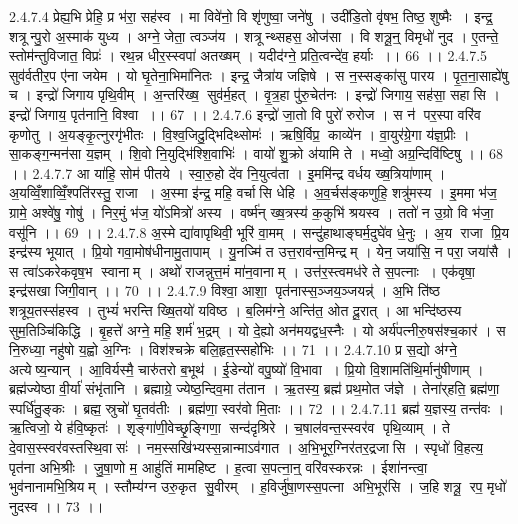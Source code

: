 2.4.7.4
प्रेह्य॒भि प्रेहि॒ प्र भ॑रा॒ सह॑स्व । मा विवे॑नो॒ वि शृ॑णुष्वा॒ जने॑षु । उदी॑डि॒तो वृ॑षभ॒ तिष्ठ॒ शुष्मैः । इन्द्र॒ शत्रून्पु॒रो अ॒स्माक॑ युध्य । अग्ने॒ जेता॒ त्वञ्ज॑य । शत्रून्थ्सहस॒ ओज॑सा । वि शत्रू॒न्॒ विमृधो॑ नुद । ए॒तन्ते॒ स्तोम॑न्तुविजात॒ विप्रः॑ । रथ॒न्न धीर॒स्स्वपा॑ अतख्षम् । यदीद॑ग्ने॒ प्रति॒त्वन्दे॑व॒ हर्याः ।। 66 ।।
2.4.7.5
सुव॑र्वतीर॒प ए॑ना जयेम । यो घृ॒तेना॒भिमा॑नितः । इन्द्र॒ जैत्रा॑य जज्ञिषे । स न॒स्सङ्का॑सु पारय । पृ॒त॒ना॒साह्ये॑षु च । इन्द्रो॑ जिगाय पृथि॒वीम् । अ॒न्तरि॑ख्ष॒॒ सुव॑र्म॒हत् । वृ॒त्र॒हा पु॑रु॒चेत॑नः । इन्द्रो॑ जिगाय॒ सह॑सा॒ सहा॑सि । इन्द्रो॑ जिगाय॒ पृत॑नानि॒ विश्वा ।। 67 ।।
2.4.7.6
इन्द्रो॑ जा॒तो वि पुरो॑ रुरोज । स न॑ पर॒स्पा वरि॑व कृणोतु । अ॒यङ्कृ॒त्नुरगृ॑भीतः । वि॒श्व॒जिदु॒द्भिदिथ्सोमः॑ । ऋषि॒र्विप्र॒ काव्ये॑न । वा॒युर॑ग्रे॒गा य॑ज्ञ॒प्रीः । सा॒कङ्ग॒न्मन॑सा य॒ज्ञम् । शि॒वो नि॒युद्भि॑श्शि॒वाभिः॑ । वायो॑ शु॒क्रो अ॑यामि ते । मध्वो॒ अग्र॒न्दिवि॑ष्टिषु ।। 68 ।।
2.4.7.7
आ या॑हि॒ सोम॑ पीतये । स्वा॒रु॒हो दे॑व नि॒युत्व॑ता । इ॒ममि॑न्द्र वर्धय ख्ष॒त्रिया॑णाम् । अ॒यव्विँ॒शाव्विँ॒श्पति॑रस्तु॒ राजा । अ॒स्मा इ॑न्द्र॒ महि॒ वर्चा॑सि धेहि । अ॒व॒र्चस॑ङ्कणुहि॒ शत्रु॑मस्य । इ॒ममा भ॑ज॒ ग्रामे॒ अश्वे॑षु॒ गोषु॑ । निर॒मुं भ॑ज॒ यो॑ऽमित्रो॑ अस्य । वर्ष्म॑न् ख्ष॒त्रस्य॑ क॒कुभि॑ श्रयस्व । ततो॑ न उ॒ग्रो वि भ॑जा॒ वसू॑नि ।। 69 ।।
2.4.7.8
अ॒स्मे द्या॑वापृथिवी॒ भूरि॑ वा॒मम् । सन्दु॑हाथाङ्घर्म॒दुघे॑व धे॒नुः । अ॒य राजा प्रि॒य इन्द्र॑स्य भूयात् । प्रि॒यो गवा॒मोष॑धीनामु॒तापाम् । यु॒नज्मि॑ त उत्त॒राव॑न्त॒मिन्द्रम् । येन॒ जया॑सि॒ न परा॒ जया॑सै । स त्वा॑ऽकरेकवृष॒भ स्वानाम् । अथो॑ राजन्नुत्त॒मं मा॑न॒वानाम् । उत्त॑र॒स्त्वमध॑रे ते स॒पत्नाः । एक॑वृषा॒ इन्द्र॑सखा जिगी॒वान् ।। 70 ।।
2.4.7.9
विश्वा॒ आशा॒ पृत॑नास्स॒ञ्जय॒ञ्जयन्न्॑ । अ॒भि ति॑ष्ठ शत्रूय॒तस्स॑हस्व । तुभ्यं॑ भरन्ति ख्षि॒तयो॑ यविष्ठ । ब॒लिम॑ग्ने॒ अन्ति॑त॒ ओत दू॒रात् । आ भन्दि॑ष्ठस्य सुम॒तिञ्चि॑किद्धि । बृ॒हत्ते॑ अग्ने॒ महि॒ शर्म॑ भ॒द्रम् । यो दे॒ह्यो अन॑मयद्वध॒स्नैः । यो अर्य॑पत्नीरु॒षस॑श्च॒कार॑ । स नि॒रुध्या॒ नहु॑षो य॒ह्वो अ॒ग्निः । विश॑श्चक्रे बलि॒हृत॒स्सहो॑भिः ।। 71 ।।
2.4.7.10
प्र स॒द्यो अ॑ग्ने॒ अत्येष्य॒न्यान् । आ॒विर्यस्मै॒ चारु॑तरो ब॒भूथ॑ । ई॒डेन्यो॑ वपु॒ष्यो॑ वि॒भावा । प्रि॒यो वि॒शामति॑थि॒र्मानु॑षीणाम् । ब्रह्म॑ज्येष्ठा वी॒र्या॑ संभृ॑तानि । ब्रह्माग्रे॒ ज्येष्ठ॒न्दिव॒मा त॑तान । ऋ॒तस्य॒ ब्रह्म॑ प्रथ॒मोत ज॑ज्ञे । तेना॑र्‌हति॒ ब्रह्म॑णा॒ स्पर्धि॑तु॒ङ्कः । ब्रह्म॒ स्रुचो॑ घृ॒तव॑तीः । ब्रह्म॑णा॒ स्वर॑वो मि॒ताः ।। 72 ।।
2.4.7.11
ब्रह्म॑ य॒ज्ञस्य॒ तन्त॑वः । ऋ॒त्विजो॒ ये ह॑वि॒ष्कृतः॑ । शृङ्गा॑णी॒वेच्छृ॒ङ्गिणा॒॒ सन्द॑दृश्रिरे । च॒षाल॑वन्त॒स्स्वर॑व पृथि॒व्याम् । ते दे॒वास॒स्स्वर॑वस्तस्थि॒वासः॑ । नम॒स्सखि॑भ्यस्स॒न्नान्माऽव॑गात । अ॒भि॒भूर॒ग्निर॑तर॒द्रजा॑सि । स्पृधो॑ वि॒हत्य॒ पृत॑ना अभि॒श्रीः । जु॒षा॒णो म॒ आहु॑तिं मामहिष्ट । ह॒त्वा स॒पत्ना॒न्॒ वरि॑वस्करन्नः । ईशा॑नन्त्वा॒ भुव॑नानामभि॒श्रियम् । स्तौम्य॑ग्न उरु॒कृत॑ सु॒वीरम् । ह॒विर्जु॑षा॒णस्स॒पत्ना॑ अभि॒भूर॑सि । ज॒हि शत्रू॒॒ रप॒ मृधो॑ नुदस्व ।। 73 ।।
